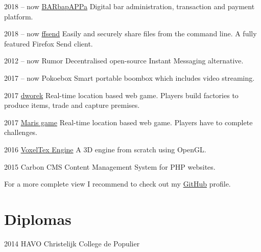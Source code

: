\documentclass[]{friggeri-cv}
\begin{document}
\begin{entrylist}

\entry
{2018 -- now}
{\href{https://github.com/timvisee/barbapappa}{BARbapAPPa}}
{}
{Digital bar administration, transaction and payment platform.}

\entry
{2018 -- now}
{\href{https://github.com/timvisee/ffsend}{ffsend}}
{}
{Easily and securely share files from the command line. A fully featured Firefox Send client.}

\entry
{2012 -- now}
{Rumor}
{}
{Decentralised open-source Instant Messaging alternative.}

\entry
{2017 -- now}
{Pokoebox}
{}
{Smart portable boombox which includes video streaming.}

\entry
{2017}
{\href{https://github.com/timvisee/dworek}{dworek}}
{}
{Real-time location based web game. Players build factories to produce items,
trade and capture premises.}

\entry
{2017}
{\href{https://github.com/timvisee/maris-game}{Maris game}}
{}
{Real-time location based web game. Players have to complete challenges.}

\entry
{2016}
{\href{https://github.com/timvisee/voxeltex-engine}{VoxelTex Engine}}
{}
{A 3D engine from scratch using OpenGL.}

\entry
{2015}
{Carbon CMS}
{}
{Content Management System for PHP websites.}

\end{entrylist}

For a more complete view I recommend to check out my
\href{https://github.com/timvisee}{GitHub}
profile.


\section{Diplomas}

\begin{entrylist}


\entry
{2014}
{HAVO}
{Christelijk College de Populier}


\end{entrylist}
\end{document}
